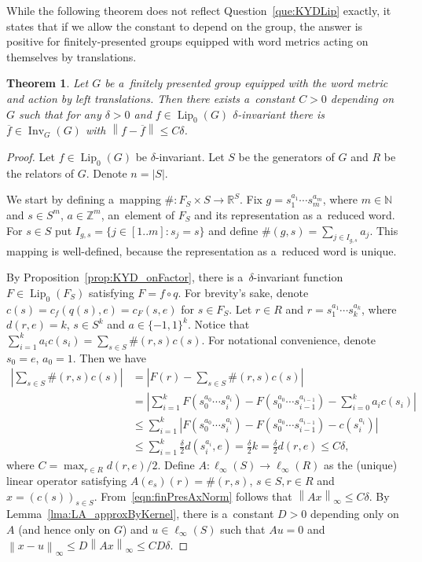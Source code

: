\documentclass[11pt,a4paper]{amsart}
\newtheorem{theorem}{Theorem}[section]
\theoremstyle{definition}
\newcommand{\R}{\mathbb{R}}
\newcommand{\Z}{\mathbb{Z}}
\newcommand{\N}{\mathbb{N}}
\newcommand{\fBar}{\overline{f}}
\newcommand{\abs}[1]{\left| #1 \right|}
\newcommand{\norm}[1]{\left\| #1 \right\|}
\newcommand{\supnorm}[1]{\norm{#1}_{\infty}}
\newcommand{\Lipz}{\operatorname{Lip}_0}
\newcommand{\inv}{\operatorname{Inv}}
\begin{document}
	While the following theorem does not reflect Question~\ref{que:KYDLip} exactly, it states that if we allow the constant to depend on the group, the answer is positive for finitely-presented groups equipped with word metrics acting on themselves by translations.
	
	\begin{theorem} \label{thm:KYDfinPres}
		Let $G$ be a~finitely presented group equipped with the word metric and action by left translations. Then there exists a~constant $C > 0$ depending on $G$ such that for any $\delta > 0$ and $f \in \Lipz(G)$ $\delta$-invariant there is $\fBar \in \inv_G(G)$ with $\norm{f - \fBar} \leq C\delta$.
	\end{theorem}
	\begin{proof}
		Let $f \in \Lipz(G)$ be $\delta$-invariant. Let $S$ be the generators of $G$ and $R$ be the relators of $G$. Denote $n = \abs{S}$.
		
		We start by defining a~mapping $\#: F_S \times S \to \R^S$. Fix $g = s_{1}^{a_1} \cdots s_{m}^{a_m}$, where $m \in \N$ and $s \in S^m$, $a \in \Z^m$, an~element of  $F_S$ and its representation as a~reduced word. For $s \in S$ put $I_{g,s} = \{j \in [1..m] \colon s_{j} = s\}$ and define $\#(g, s) = \sum_{j \in I_{g,s}} a_j$. This mapping is well-defined, because the representation as a~reduced word is unique.
		
		By Proposition~\ref{prop:KYD_onFactor}, there is a~$\delta$-invariant function $F \in \Lipz(F_S)$ satisfying $F = f \circ q$. For brevity's sake, denote $c(s) = c_f(q(s), e) = c_F(s, e)$ for $s \in F_S$. Let $r \in R$ and $r = s_1^{a_1}\cdots s_k^{a_k}$, where $d(r,e) = k$, $s \in S^k$ and $a \in \{-1, 1\}^k$. Notice that $\sum_{i=1}^k a_ic(s_i) = \sum_{s \in S} \#(r, s)c(s)$. For notational convenience, denote $s_0 = e$, $a_0 = 1$. Then we have
		\begin{equation} \label{eqn:finPresAxNorm}
			\begin{split}
				\abs{\sum_{s \in S} \#(r, s)c(s)}
				&= \abs{F(r) - \sum_{s \in S} \#(r, s)c(s)}\\
				&= \abs{\sum_{i=1}^k F(s_0^{a_0} \cdots s_{i}^{a_i}) - F(s_0^{a_0} \cdots s_{i-1}^{a_{i-1}}) - \sum_{i=0}^k a_ic(s_i)}\\
				&\leq \sum_{i=1}^k \abs{F(s_0^{a_0} \cdots s_{i}^{a_i}) - F(s_0^{a_0} \cdots s_{i-1}^{a_{i-1}}) - c(s_i^{a_i})}\\
				&\leq \sum_{i=1}^k \frac{\delta}{2} d(s_i^{a_i}, e)
				= \frac{\delta}{2} k = \frac{\delta}{2} d(r,e) \leq C\delta,
			\end{split}
		\end{equation}
		where $C = \max_{r \in R} d(r, e)/2$.
		Define $A: \ell_\infty(S) \to \ell_\infty(R)$ as the (unique) linear operator satisfying $A(e_s)(r) = \#(r,s)$, $s \in S, r \in R$ and $x = (c(s))_{s \in S}$. From~\eqref{eqn:finPresAxNorm} follows that $\norm{Ax}_\infty \leq C\delta$.
		By Lemma~\ref{lma:LA_approxByKernel}, there is a~constant $D > 0$ depending only on $A$ (and hence only on $G$) and $u \in \ell_{\infty}(S)$ such that $Au = 0$ and $\supnorm{x - u} \leq D\supnorm{Ax} \leq CD\delta$.
		

\end{proof}
\end{document}
